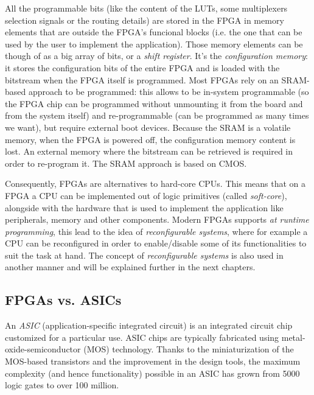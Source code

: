 All the programmable bits (like the content of the LUTs, some multiplexers selection signals or the routing details) are stored in the FPGA in memory elements that are outside the FPGA's funcional blocks (i.e. the one that can be used by the user to implement the application). Those memory elements can be though of as a big array of bits, or a \textit{shift register}. It's the \textit{configuration memory}: it stores the configuration bits of the entire FPGA and is loaded with the bitstream when the FPGA itself is programmed. Most FPGAs rely on an SRAM-based approach to be programmed: this allows to be in-system programmable (so the FPGA chip can be programmed without unmounting it from the board and from the system itself) and re-programmable (can be programmed as many times we want), but require external boot devices. Because the SRAM is a volatile memory, when the FPGA is powered off, the configuration memory content is lost. An external memory where the bitstream can be retrieved is required in order to re-program it. The SRAM approach is based on CMOS.\bigskip

Consequently, FPGAs are alternatives to hard-core CPUs. This means that on a FPGA a CPU can be implemented out of logic primitives (called \textit{soft-core}), alongside with the hardware that is used to implement the application like peripherals, memory and other components. Modern FPGAs supports \textit{at runtime programming}, this lead to the idea of \textit{reconfigurable systems}, where for example a CPU can be reconfigured in order to enable/disable some of its functionalities to suit the task at hand. The concept of \textit{reconfigurable systems} is also used in another manner and will be explained further in the next chapters.

\subsection{FPGAs vs. ASICs}

An \textit{ASIC} (application-specific integrated circuit) is an integrated circuit chip customized for a particular use. ASIC chips are typically fabricated using metal-oxide-semiconductor (MOS) technology. Thanks to the miniaturization of the MOS-based transistors and the improvement in the design tools, the maximum complexity (and hence functionality) possible in an ASIC has grown from 5000 logic gates to over 100 million. \bigskip

